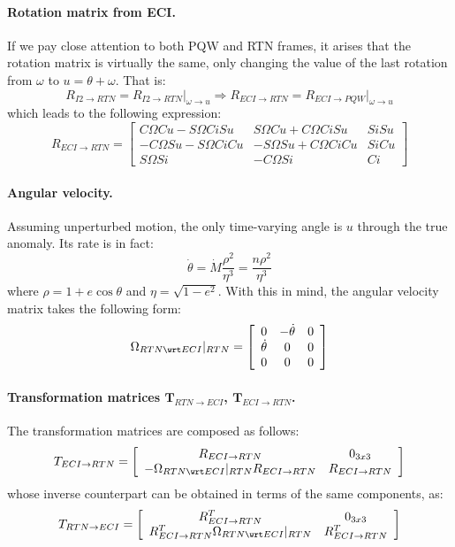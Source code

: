 			\paragraph{Rotation matrix from ECI. \\}
			\indent If we pay close attention to both PQW and RTN frames, it arises that the rotation matrix is virtually the same, only changing the value of the last rotation from $\omega$ to $u = \theta + \omega$. That is:
			\[
			R_{I2 \to RTN} = R_{I2\to RTN} \rvert_{\omega \to u} \Rightarrow R_{ECI\to RTN} = R_{ECI\to PQW}\rvert_{\omega \to u}
			\]
			\noindent which leads to the following expression:
			\[
			R_{ECI\to RTN} = \left[ \begin{array}{ccc}
			C\Omega C u - S\Omega C i S u 			& S\Omega C u + C\Omega C i S u & S i S u \\
			-C\Omega S u - S\Omega C i C u 			& -S\Omega S u + C\Omega C i C u & S i C u \\
			S\Omega S i 							& - C\Omega S i 			& C i
			\end{array}\right]
			\]
			\paragraph{Angular velocity. \\}
			\indent Assuming unperturbed motion, the only time-varying angle is $u$ through the true anomaly. Its rate is in fact:
			\[
			\dot{\theta} = \dot{M} \dfrac{\rho^2}{\eta^{3}} = \dfrac{n \rho^2}{\eta^3}
			\]
			\noindent where $\rho = 1 + e \cos\theta$ and $\eta = \sqrt{1 - e^2}$. With this in mind, the angular velocity matrix takes the following form:
			\[
			\Omega_{RTN\wrt ECI}\rvert_{RTN} = \left[ \begin{array}{ccc}
			0 			& -\dot{\theta} 	& 0 \\
			\dot{\theta} & 0 			& 0 \\
			0 			& 0 			& 0
			\end{array}\right]
			\]
			\paragraph{Transformation matrices $\bm T_{RTN\rightarrow ECI}$, $\bm T_{ECI\rightarrow RTN}$. \\}
			\indent The transformation matrices are composed as follows:
			\[
			 T_{ECI\to RTN} = \left[\begin{array}{cc}
	R_{ECI\to RTN} & 0_{3x3} \\
	-\Omega_{RTN \wrt ECI}\rvert_{RTN} R_{ECI\to RTN}   & R_{ECI\to RTN} 
	\end{array}\right]
			\]
			\noindent whose inverse counterpart can be obtained in terms of the same components, as:
			\[
			 T_{RTN\to ECI} = \left[\begin{array}{cc}
	R_{ECI\to RTN}^T & 0_{3x3} \\
	R_{ECI\to RTN}^T\Omega_{RTN \wrt ECI}\rvert_{RTN} & R_{ECI\to RTN}^T
	\end{array}\right]
			\]
			
